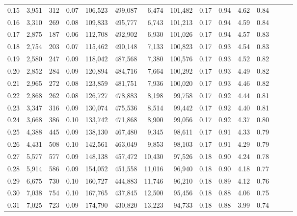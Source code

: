 \begin{tabular}{rrrrrrrrrrrrrrr}
0.15 &   3,951 &    312 &  0.07 &  106,523 &  499,087 &    6,474 &  101,482 &  0.17 &  0.94 &  4.62 &      0.84 \\
0.16 &   3,310 &    269 &  0.08 &  109,833 &  495,777 &    6,743 &  101,213 &  0.17 &  0.94 &  4.59 &      0.84 \\
0.17 &   2,875 &    187 &  0.06 &  112,708 &  492,902 &    6,930 &  101,026 &  0.17 &  0.94 &  4.57 &      0.83 \\
0.18 &   2,754 &    203 &  0.07 &  115,462 &  490,148 &    7,133 &  100,823 &  0.17 &  0.93 &  4.54 &      0.83 \\
0.19 &   2,580 &    247 &  0.09 &  118,042 &  487,568 &    7,380 &  100,576 &  0.17 &  0.93 &  4.52 &      0.82 \\
0.20 &   2,852 &    284 &  0.09 &  120,894 &  484,716 &    7,664 &  100,292 &  0.17 &  0.93 &  4.49 &      0.82 \\
0.21 &   2,965 &    272 &  0.08 &  123,859 &  481,751 &    7,936 &  100,020 &  0.17 &  0.93 &  4.46 &      0.82 \\
0.22 &   2,868 &    262 &  0.08 &  126,727 &  478,883 &    8,198 &   99,758 &  0.17 &  0.92 &  4.44 &      0.81 \\
0.23 &   3,347 &    316 &  0.09 &  130,074 &  475,536 &    8,514 &   99,442 &  0.17 &  0.92 &  4.40 &      0.81 \\
0.24 &   3,668 &    386 &  0.10 &  133,742 &  471,868 &    8,900 &   99,056 &  0.17 &  0.92 &  4.37 &      0.80 \\
0.25 &   4,388 &    445 &  0.09 &  138,130 &  467,480 &    9,345 &   98,611 &  0.17 &  0.91 &  4.33 &      0.79 \\
0.26 &   4,431 &    508 &  0.10 &  142,561 &  463,049 &    9,853 &   98,103 &  0.17 &  0.91 &  4.29 &      0.79 \\
0.27 &   5,577 &    577 &  0.09 &  148,138 &  457,472 &   10,430 &   97,526 &  0.18 &  0.90 &  4.24 &      0.78 \\
0.28 &   5,914 &    586 &  0.09 &  154,052 &  451,558 &   11,016 &   96,940 &  0.18 &  0.90 &  4.18 &      0.77 \\
0.29 &   6,675 &    730 &  0.10 &  160,727 &  444,883 &   11,746 &   96,210 &  0.18 &  0.89 &  4.12 &      0.76 \\
0.30 &   7,038 &    754 &  0.10 &  167,765 &  437,845 &   12,500 &   95,456 &  0.18 &  0.88 &  4.06 &      0.75 \\
0.31 &   7,025 &    723 &  0.09 &  174,790 &  430,820 &   13,223 &   94,733 &  0.18 &  0.88 &  3.99 &      0.74 \\

\end{tabular}
